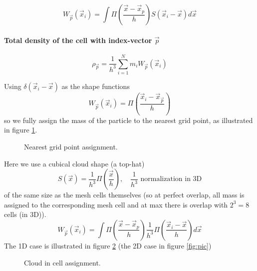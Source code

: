 \begin{equation}
    W_{\vec{p}}\left(\vec{x}_i\right)=\int \Pi\left(\frac{\vec{x}-\vec{x}_p}{h}\right) S\left(\vec{x}_i-\vec{x}\right) d \vec{x}
\end{equation}

\paragraph*{Total density of the cell with index-vector $\vec{p}$}
\begin{equation}
    \rho_\vec{p} = \frac{1}{h^3}\sum_{i=1}^N m_i W_\vec{p}(\vec{x}_i)
\end{equation}


Using $\delta(\vec{x}_i - \vec{x})$ as the shape functions
\begin{equation}
    W_{\vec{p}}\left(\vec{x}_i\right)=\Pi\left(\frac{\vec{x}_i-\vec{x}_{\vec{p}}}{h}\right)
\end{equation}
so we fully assign the mass of the particle to the nearest grid point, as illustrated in figure \ref{fig:ngp}.
\begin{figure}[H]
    \centering
    
    \caption{Nearest grid point assignment.}
    \label{fig:ngp}
\end{figure}

Here we use a cubical cloud shape (a top-hat)
\begin{equation}
    S(\vec{x}) = \frac{1}{h^3} \Pi\left(\frac{\vec{x}}{h}\right), \quad \frac{1}{h^3} \text{ normalization in 3D}
\end{equation}
of the same size as the mesh cells themselves (so at perfect overlap, all mass is assigned to the 
corresponding mesh cell and at max there is overlap with $2^3 = 8$ cells (in 3D)).
\begin{equation}
    W_{\vec{p}}\left(\vec{x}_i\right)=\int \Pi\left(\frac{\vec{x}-\vec{x}_p}{h}\right) \frac{1}{h^3} \Pi\left(\frac{\vec{x}_i-\vec{x}}{h}\right) d \vec{x}
\end{equation}
The 1D case is illustrated in figure \ref{fig:cic} (the 2D case in figure \ref{fig:pic})
\begin{figure}[H]
    \centering
    
    \caption{Cloud in cell assignment.}
    \label{fig:cic}
\end{figure}
